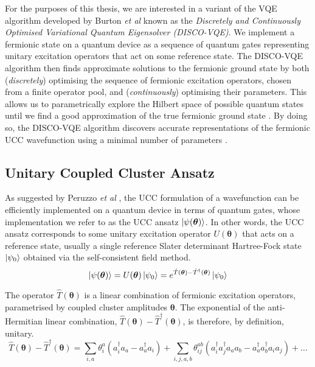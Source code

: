 For the purposes of this thesis, we are interested in a variant of the VQE algorithm developed by Burton \textit{et al} \cite{Burton2023} known as the \textit{Discretely and Continuously Optimised Variational Quantum Eigensolver (DISCO-VQE)}. We implement a fermionic state on a quantum device as a sequence of quantum gates representing unitary excitation operators that act on some reference state. The DISCO-VQE algorithm then finds approximate solutions to the fermionic ground state by both (\textit{discretely}) optimising the sequence of fermionic excitation operators, chosen from a finite operator pool, and (\textit{continuously}) optimising their parameters. This allows us to parametrically explore the Hilbert space of possible quantum states until we find a good approximation of the true fermionic ground state \cite{Taube2006}. By doing so, the DISCO-VQE algorithm discovers accurate representations of the fermionic UCC wavefunction using a minimal number of parameters \cite{Burton2023}.



\subsection{Unitary Coupled Cluster Ansatz}%
\label{unitary-coupled-cluster-ansatz}

As suggested by Peruzzo \textit{et al} \cite{Peruzzo2014}, the UCC formulation of a wavefunction can be efficiently implemented on a quantum device in terms of quantum gates, whose implementation we refer to as the UCC ansatz $\ket{\psi(\bm\theta)}$. In other words, the UCC ansatz corresponds to some unitary excitation operator $U(\bm\theta)$ that acts on a reference state, usually a single reference Slater determinant Hartree-Fock state $\ket{\psi_0}$ obtained via the self-consistent field method.
\begin{equation*}
    \ket{\psi(\bm\theta)} = U(\bm\theta) \ket{\psi_0} =
    e^{\hat T(\bm\theta) - \hat T^\dagger(\bm\theta)} \ket{\psi_0}
\end{equation*}

The operator $\hat T(\bm\theta)$ is a linear combination of fermionic excitation operators, parametrised by coupled cluster amplitudes $\bm\theta$. The exponential of the anti-Hermitian linear combination, $\hat T(\bm\theta) - \hat T^\dagger(\bm\theta)$, is therefore, by definition, unitary. 
\begin{equation*}
\hat T(\bm{\theta}) - \hat T^{\dagger}(\bm{\theta}) =
\sum_{i, a} \theta^a_i (a^\dagger_i a_a - a^\dagger_a a_i) + 
\sum_{i, j, a, b} \theta^{ab}_{ij} (a^\dagger_i a^\dagger_j a_a a_b - a^\dagger_a a^\dagger_b a_i a_j) + \dots
\end{equation*}

